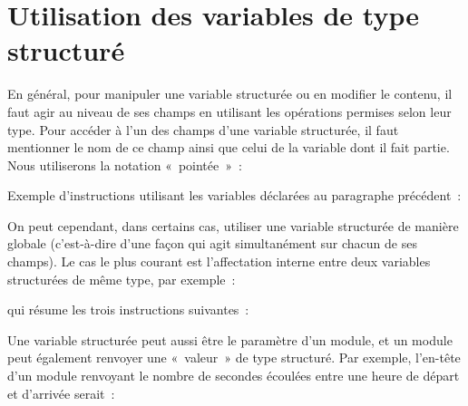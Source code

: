 
\section{Utilisation des variables de type structuré}

	En général, pour manipuler une variable
	structurée ou en modifier le contenu, il faut agir au niveau de ses
	champs en utilisant les opérations permises selon leur type. Pour
	accéder à l’un des champs d’une variable structurée, il faut mentionner
	le nom de ce champ ainsi que celui de la variable dont il fait partie.
	Nous utiliserons la notation «~pointée~»~:


	Exemple d’instructions utilisant les variables
	déclarées au paragraphe précédent~:


	On peut cependant, dans certains cas, utiliser
	une variable structurée de manière globale (c’est-à-dire d’une façon
	qui agit simultanément sur chacun de ses champs). Le cas le plus
	courant est l’affectation interne entre deux variables structurées de
	même type, par exemple~:


	qui résume les trois instructions suivantes~:


	Une variable structurée peut aussi être le
	paramètre d’un module, et un module peut également renvoyer une
	«~valeur~» de type structuré. Par exemple, l’en-tête d’un module
	renvoyant le nombre de secondes écoulées entre une heure de départ et
	d’arrivée serait~:

